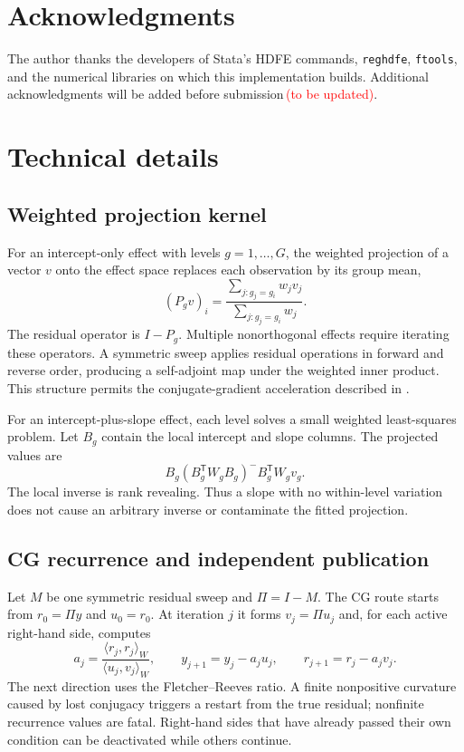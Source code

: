 \documentclass[11pt]{article}
\newcommand{\reghdfe}{\texttt{reghdfe}}
\newcommand{\tbu}{\textcolor{red}{\,(\textup{to be updated})}}
\newcommand{\trans}{\mathsf{T}}
\begin{document}
\section*{Acknowledgments}

The author thanks the developers of Stata's HDFE commands, \reghdfe,
\texttt{ftools}, and the numerical libraries on which this implementation
builds.  Additional acknowledgments will be added before submission\tbu.

\clearpage
\appendix

\section{Technical details}
\label{app:technical}

\subsection{Weighted projection kernel}

For an intercept-only effect with levels $g=1,\ldots,G$, the weighted
projection of a vector $v$ onto the effect space replaces each observation by
its group mean,
\[
  (P_gv)_i =
  \frac{\sum_{j:g_j=g_i}w_jv_j}
       {\sum_{j:g_j=g_i}w_j}.
\]
The residual operator is $I-P_g$.  Multiple nonorthogonal effects require
iterating these operators.  A symmetric sweep applies residual operations in
forward and reverse order, producing a self-adjoint map under the weighted
inner product.  This structure permits the conjugate-gradient acceleration
described in .

For an intercept-plus-slope effect, each level solves a small weighted
least-squares problem.  Let $B_g$ contain the local intercept and slope
columns.  The projected values are
\[
  B_g(B_g^\trans W_gB_g)^{-}B_g^\trans W_gv_g.
\]
The local inverse is rank revealing.  Thus a slope with no within-level
variation does not cause an arbitrary inverse or contaminate the fitted
projection.

\subsection{CG recurrence and independent publication}

Let $M$ be one symmetric residual sweep and $\Pi=I-M$.  The CG route starts
from $r_0=\Pi y$ and $u_0=r_0$.  At iteration $j$ it forms
$v_j=\Pi u_j$ and, for each active right-hand side, computes
\[
  a_j=\frac{\langle r_j,r_j\rangle_W}
            {\langle u_j,v_j\rangle_W},
  \qquad
  y_{j+1}=y_j-a_ju_j,
  \qquad
  r_{j+1}=r_j-a_jv_j.
\]
The next direction uses the Fletcher--Reeves ratio.  A finite nonpositive
curvature caused by lost conjugacy triggers a restart from the true residual;
nonfinite recurrence values are fatal.  Right-hand sides that have already
passed their own condition can be deactivated while others continue.
\end{document}
